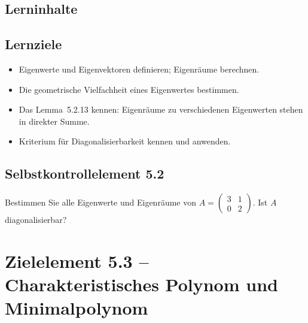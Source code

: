 \documentclass[a4paper,12pt]{article}
\begin{document}
\subsection*{Lerninhalte}
\begin{center}
\end{center}

\subsection*{Lernziele}
\begin{itemize}
  \item Eigenwerte und Eigenvektoren definieren; Eigenräume berechnen.
  \item Die geometrische Vielfachheit eines Eigenwertes bestimmen.
  \item Das Lemma~5.2.13 kennen: Eigenräume zu verschiedenen Eigenwerten stehen in direkter Summe.
  \item Kriterium für Diagonalisierbarkeit kennen und anwenden.
\end{itemize}

\subsection*{Selbstkontrollelement 5.2}
Bestimmen Sie alle Eigenwerte und Eigenräume von $A = \begin{pmatrix}3&1\\0&2\end{pmatrix}$.
Ist $A$ diagonalisierbar?

\newpage

\section*{Zielelement 5.3 -- Charakteristisches Polynom und Minimalpolynom}
\end{document}
